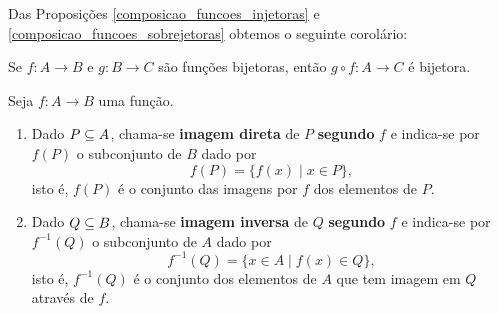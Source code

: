 Das Proposições \ref{composicao_funcoes_injetoras} e \ref{composicao_funcoes_sobrejetoras} obtemos o seguinte corolário:

\begin{corolario}
    Se $f : A \to B$ e $g : B \to C$ são funções bijetoras, então $g \circ f: A \to C$ é bijetora.
\end{corolario}
\begin{definicao}
    Seja $f : A \to B$ uma função.
    \begin{enumerate}[label={\roman*})]
        \item Dado $P \subseteq A$, chama-se \textbf{imagem direta} de $P$  \textbf{segundo} $f$ e indica-se por $f(P)$ o subconjunto de $B$ dado por
        \[
            f(P) = \{f(x) \mid x \in P\},
        \]
        isto é, $f(P)$ é o conjunto das imagens por $f$ dos elementos de $P$.

        \item Dado $Q \subseteq B$, chama-se \textbf{imagem inversa} de $Q$ \textbf{segundo} $f$ e indica-se por $f^{-1}(Q)$ o subconjunto de $A$ dado por
        \[
            f^{-1}(Q) = \{x \in A \mid f(x) \in Q\},
        \]
        isto é, $f^{-1}(Q)$ é o conjunto dos elementos de $A$ que tem imagem em $Q$ através de $f$.
    \end{enumerate}
\end{definicao}


